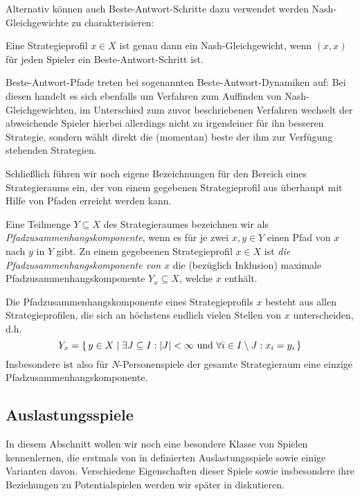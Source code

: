 Alternativ können auch Beste-Antwort-Schritte dazu verwendet werden Nash-Gleichgewichte zu charakterisieren:

\begin{beob}\label{beob:BASchritteNG}
	Eine Strategieprofil $x \in X$ ist genau dann ein Nash-Gleichgewicht, wenn $(x,x)$ für jeden Spieler ein Beste-Antwort-Schritt ist.
\end{beob}

Beste-Antwort-Pfade treten bei sogenannten Beste-Antwort-Dynamiken auf: Bei diesen handelt es sich ebenfalls um Verfahren zum Auffinden von Nash-Gleichgewichten, im Unterschied zum zuvor beschriebenen Verfahren wechselt der abweichende Spieler hierbei allerdings nicht zu irgendeiner für ihn besseren Strategie, sondern wählt direkt die (momentan) beste der ihm zur Verfügung stehenden Strategien. 

Schließlich führen wir noch eigene Bezeichnungen für den Bereich eines Strategieraums ein, der von einem gegebenen Strategieprofil aus überhaupt mit Hilfe von Pfaden erreicht werden kann. 

\begin{defn}
	Eine Teilmenge $Y \subseteq X$ des Strategieraumes bezeichnen wir als \emph{Pfadzusammenhangskomponente}, wenn es für je zwei $x, y \in Y$ einen Pfad von $x$ nach $y$ in $Y$ gibt. Zu einem gegebeenen Strategieprofil $x \in X$ ist \emph{die Pfadzusammenhangskomponente von $x$} die (bezüglich Inklusion) maximale Pfadzusammenhangskomponente $Y_x \subseteq X$, welche $x$ enthält.
\end{defn}

\begin{beob}
	Die Pfadzusammenhangskomponente eines Strategieprofils $x$ besteht aus allen Strategieprofilen, die sich an höchstens endlich vielen Stellen von $x$ unterscheiden, d.h.
	\[Y_x = \set{y \in X | \exists J \subseteq I: \left|J\right| < \infty \text{ und } \forall i \in I\setminus J: x_i = y_i } \]
	Insbesondere ist also für $N$-Personenspiele der gesamte Strategieraum eine einzige Pfadzusammenhangskomponente.
\end{beob}


\subsection{Auslastungsspiele}

In diesem Abschnitt wollen wir noch eine besondere Klasse von Spielen kennenlernen, die erstmals von \citeauthor{RosenthalPotential} in \cite{RosenthalPotential} definierten Auslastungsspiele sowie einige Varianten davon. Verschiedene Eigenschaften dieser Spiele sowie insbesondere ihre Beziehungen zu Potentialspielen werden wir später in  diskutieren.

